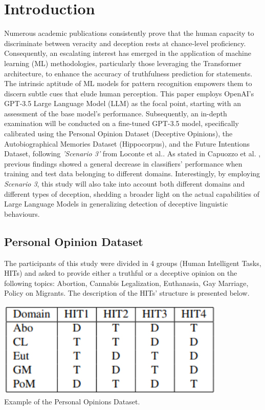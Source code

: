 \documentclass[10pt,twocolumn,letterpaper]{article}
\begin{document}
\section{Introduction}
Numerous academic publications consistently prove that the human capacity to discriminate 
between veracity and deception rests at chance-level proficiency. Consequently, an escalating 
interest has emerged in the application of machine learning (ML) methodologies, particularly 
those leveraging the Transformer architecture, to enhance the accuracy of truthfulness prediction for statements. 
The intrinsic aptitude of ML models for pattern recognition empowers them to discern subtle cues 
that elude human perception. This paper employs OpenAI's GPT-3.5 Large Language Model (LLM) 
as the focal point, starting with an assessment of the base model's performance. Subsequently, 
an in-depth examination will be conducted on a fine-tuned GPT-3.5 model, specifically calibrated using the 
Personal Opinion Dataset (Deceptive Opinions), the Autobiographical Memories Dataset (Hippocorpus), and the 
Future Intentions Dataset, following \textit{'Scenario 3'} from Loconte et al.\cite{Loconte}.
As stated in Capuozzo et al. \cite{Capuozzo}, previous findings showed a general decrease in classifiers'
performance when training and test data belonging to different domains. Interestingly, by employing \textit{Scenario 3},
this study will also take into account both different domains and different types of deception, shedding a broader light
on the actual capabilities of Large Language Models in generalizing detection of deceptive linguistic behaviours.

\subsection{Personal Opinion Dataset}

The participants of this study \cite{Capuozzo} were divided in 4 groups (Human Intelligent Tasks, HITs) and asked to provide either 
a truthful or a deceptive opinion on the following topics: Abortion, Cannabis Legalization, Euthanasia, Gay Marriage, Policy on Migrants.
The description of the HITs' structure is presented below. \\

\begin{center}
\includegraphics[scale=0.40]{img/pers_op_dataset.jpg} \\
\small {Example of the Personal Opinions Dataset.}
\end{center}
\end{document}
